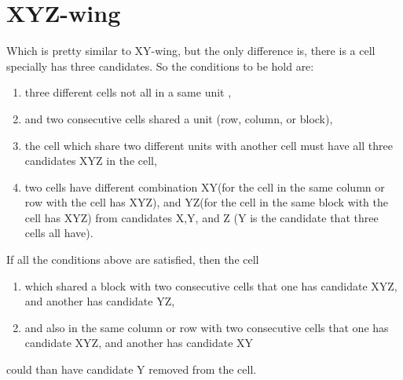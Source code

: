 \documentclass[11pt]{report}
\begin{document}
\section{XYZ-wing}
\label{sec:XYZ-wing}

Which is pretty similar to XY-wing, but the only difference is, there is a cell specially has three candidates. So the conditions to be hold are:
\begin{enumerate}
\item three different cells not all in a same unit ,
\item and two consecutive cells shared a unit (row, column, or block),
\item the cell which share two different units with another cell must have all three candidates XYZ in the cell,
\item two cells have different combination XY(for the cell in the same column or row with the cell has XYZ), and YZ(for the cell in the same block with the cell has XYZ) from candidates  X,Y, and Z (Y is the candidate that three cells all have).
\end{enumerate}
If all the conditions above are satisfied, then the cell
\begin{enumerate}
\item which shared a block with two consecutive cells that one has candidate XYZ, and another has candidate YZ,
\item and also in the same column or row with two consecutive cells that one has candidate XYZ, and another has candidate XY
\end{enumerate}
could than have candidate Y removed from the cell.
\end{document}
